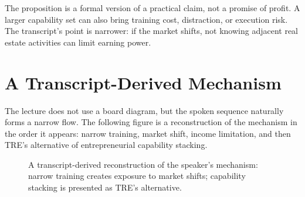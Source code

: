 \begin{remark}
The proposition is a formal version of a practical claim, not a promise of profit. A larger capability set can also bring training cost, distraction, or execution risk. The transcript's point is narrower: if the market shifts, not knowing adjacent real estate activities can limit earning power.
\end{remark}

\section{A Transcript-Derived Mechanism}

The lecture does not use a board diagram, but the spoken sequence naturally forms a narrow flow. The following figure is a reconstruction of the mechanism in the order it appears: narrow training, market shift, income limitation, and then TRE's alternative of entrepreneurial capability stacking.

\begin{figure}
\centering
{}
\caption{A transcript-derived reconstruction of the speaker's mechanism: narrow training creates exposure to market shifts; capability stacking is presented as TRE's alternative.}
\end{figure}

